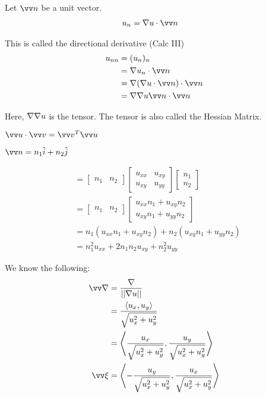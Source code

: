 Let $\vv n$ be a unit vector.
%
\begin{align}
  u_n & = \grad u \cdot \vv n
\end{align}

This is called the directional derivative (Calc III)
%
\begin{align}
  u_{nn}
  & = (u_n)_n\\
  & = \grad u_n \cdot \vv n\\
  & = \grad(\grad u \cdot \vv n) \cdot \vv n\\
  & = \grad \grad u \vv n \cdot \vv n
\end{align}

Here, $\nabla \nabla u$ is the tensor. The tensor is also called the Hessian Matrix.

$\vv u \cdot \vv v = \vv v^T \vv u$

$\vv n = n_1 \hat i + n_2 \hat j$

%
\begin{align}
  & =
  \begin{bmatrix}
    n_1 & n_2
  \end{bmatrix}
  \begin{bmatrix}
    u_{xx} & u_{xy}\\
    u_{xy} & u_{yy}
  \end{bmatrix}
  \begin{bmatrix}
    n_1\\
    n_2
  \end{bmatrix}\\
  & =
  \begin{bmatrix}
    n_1 & n_2
  \end{bmatrix}
  \begin{bmatrix}
    u_{xx}n_1 + u_{xy} n_2\\
    u_{xy}n_1 + u_{yy} n_2
  \end{bmatrix}\\
  & =
    n_1 (u_{xx}n_1 + u_{xy} n_2) +
    n_2 (u_{xy}n_1 + u_{yy} n_2)\\
  & =
    n^2_1 u_{xx} + 2n_1 n_2 u_{xy} + n^2_2 u_{yy}
\end{align}

We know the following:
%
\begin{align}
  \vv \nabla
  & = \frac{\grad}{||\grad u||}\\
  & = \frac{\left<u_x, u_y\right>}{\sqrt{u^2_x + u^2_y}}\\
  & = \left<  \frac{u_x}{\sqrt{u^2_x + u^2_y}} , \frac{u_y}{\sqrt{u^2_x + u^2_y}} \right>\\
  \vv \xi & = \left<- \frac{u_y}{\sqrt{u^2_x + u^2_y}} , \frac{u_x}{\sqrt{u^2_x + u^2_y}} \right>
\end{align}

